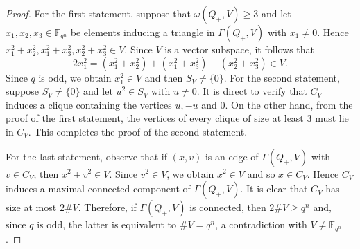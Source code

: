 \documentclass[10pt,a4paper]{amsart}
\newcommand{\F}{\mathbb F}
\newcommand{\G}{\Gamma}
\begin{document}
\begin{proof}
For the first statement, suppose that $\omega(Q_+, V)\ge 3$ and let $x_1, x_2, x_3\in \F_{q^n}$ be elements inducing a triangle in $\G(Q_+, V)$ with $x_1\ne 0$. Hence $x_1^2+x_2^2, x_1^2+x_3^2, x_2^2+x_3^2\in V$. Since $V$ is a vector subspace, it follows that
$$2x_1^2=(x_1^2+x_2^2)+(x_1^2+x_3^2)-(x_2^2+x_3^2)\in V.$$
Since $q$ is odd, we obtain $x_1^2\in V$ and then $S_V\ne \{0\}$.
For the second statement, suppose $S_V\ne \{0\}$ and let $u^2\in S_V$ with $u\ne 0$. It is direct to verify that $C_V$ induces a clique containing the vertices $u, -u$ and $0$. On the other hand, from the proof of the first statement, the vertices of every clique of size at least $3$ must lie in $C_V$. This completes the proof of the second statement. 

For the last statement, observe that if $(x, v)$ is an edge of $\G(Q_+, V)$
 with $v\in C_V$, then $x^2+v^2\in V$. Since $v^2\in V$, we obtain $x^2\in V$ and so $x\in C_V$. Hence $C_V$ induces a maximal connected component of $\G(Q_+, V)$. It is clear that $C_V$ has size at most $2\# V$. Therefore, if $\G(Q_+, V)$ is connected, then $2\# V\ge q^n$ and, since $q$ is odd, the latter is equivalent to $\# V=q^n$, a contradiction with $V\ne \F_{q^n}$.
\end{proof}
\end{document}
